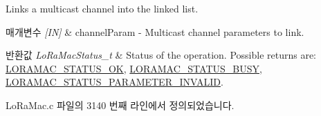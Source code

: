 Links a multicast channel into the linked list.


\begin{DoxyParams}{매개변수}
{\em \mbox{[}\+I\+N\mbox{]}} & channel\+Param -\/ Multicast channel parameters to link.\\
\hline
\end{DoxyParams}

\begin{DoxyRetVals}{반환값}
{\em Lo\+Ra\+Mac\+Status\+\_\+t} & Status of the operation. Possible returns are\+: \mbox{\hyperlink{group___l_o_r_a_m_a_c_gga1d18f26b344040b3ec5c3db662919661a03db5fca052313edb3823c014b653a74}{L\+O\+R\+A\+M\+A\+C\+\_\+\+S\+T\+A\+T\+U\+S\+\_\+\+OK}}, \mbox{\hyperlink{group___l_o_r_a_m_a_c_gga1d18f26b344040b3ec5c3db662919661a66b12f569207eacd97ee1c1d6c4cee6d}{L\+O\+R\+A\+M\+A\+C\+\_\+\+S\+T\+A\+T\+U\+S\+\_\+\+B\+U\+SY}}, \mbox{\hyperlink{group___l_o_r_a_m_a_c_gga1d18f26b344040b3ec5c3db662919661ad0d3119f247d00e1787dda106fcb3017}{L\+O\+R\+A\+M\+A\+C\+\_\+\+S\+T\+A\+T\+U\+S\+\_\+\+P\+A\+R\+A\+M\+E\+T\+E\+R\+\_\+\+I\+N\+V\+A\+L\+ID}}. \\
\hline
\end{DoxyRetVals}


Lo\+Ra\+Mac.\+c 파일의 3140 번째 라인에서 정의되었습니다.


